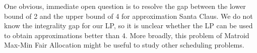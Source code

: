 One obvious, immediate open question is to resolve the gap between the lower bound of 2 and the upper bound of 4 for approximation Santa Claus.
We do not know the integrality gap for our LP, so it is unclear whether the LP can be used to obtain approximations better than 4. 
More broadly, this problem of Matroid Max-Min Fair Allocation might be useful to study other scheduling problems. 










